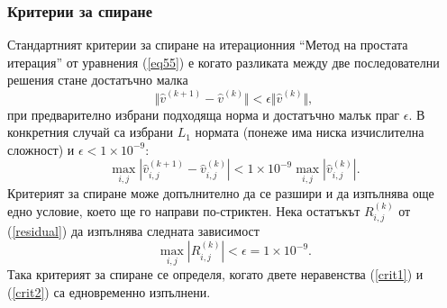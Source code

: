 \documentclass{article}
\newcommand{\rf}[1]{(\ref{#1})}
\theoremstyle{remark}
\begin{document}
\subsubsection{Критерии за спиране}
Стандартният критерии за спиране на итерационния ``Метод на простата итерация'' от уравнения \rf{eq55} е когато разликата между две последователни решения стане достатъчно малка
\begin{equation*}
\Vert \widehat{v}^{(k+1)}-\widehat{v}^{(k)}\Vert  < \epsilon \Vert \widehat{v}^{(k)}\Vert ,
\end{equation*}
при предварително избрани подходяща норма и достатъчно малък праг $\epsilon$. В конкретния случай са избрани $L_1$ нормата (понеже има ниска изчислителна сложност) и $\epsilon < 1\times10^{-9}$:
\begin{equation}\label{crit1}
\max_{i,j} |\widehat{v}^{(k+1)}_{i,j}-\widehat{v}^{(k)}_{i,j}| < 1\times10^{-9} \max_{i,j} |\widehat{v}^{(k)}_{i,j}|.
\end{equation}
Критерият за спиране може допълнително да се разшири и да изпълнява още едно условие, което ще го направи по-стриктен. Нека остатъкът $R_{i,j}^{(k)}$ от \rf{residual} да изпълнява следната зависимост
\begin{equation}\label{crit2}
\max_{i,j} |R_{i,j}^{(k)}| < \epsilon = 1\times10^{-9}.
\end{equation}
Така критерият за спиране се определя, когато двете неравенства \rf{crit1} и \rf{crit2} са едновременно изпълнени.
\end{document}
